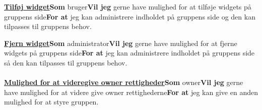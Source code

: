 \textbf{\underline{Tilføj widget}}\newline \textbf{Som} bruger\newline \textbf{Vil jeg} gerne have mulighed for at tilføje widgets på gruppens side\newline \textbf{For at} jeg kan administrere indholdet på gruppens side og den kan tilpasses til gruppens behov.



\textbf{\underline{Fjern widget}}\newline \textbf{Som} administrator\newline \textbf{Vil jeg} gerne have mulighed for at fjerne widgets på gruppens side\newline \textbf{For at} jeg kan administrere indholdet på gruppens side så den kan tilpasses til gruppens behov.  \\\\

\textbf{\underline{Mulighed for at videregive owner rettigheder}}\newline \textbf{Som} owner\newline \textbf{Vil jeg} gerne have mulighed for at videre give owner rettighederne\newline \textbf{For at} jeg kan give en anden mulighed for at styre gruppen.  \\\\
